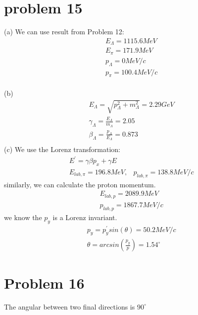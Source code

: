 \documentclass{article}
\begin{document}
\begin{CJK*}{GBK}{song}
\section{problem 15}
(a) We can use result from Problem 12:
\begin{equation} 
\begin{aligned}
&E_{\Lambda}=1115.6MeV\\
&E_{\pi}=171.9MeV\\
&p_{\Lambda}=0MeV/c\\
&p_{\pi}=100.4MeV/c\\
\end{aligned}
\end{equation}


(b)
\begin{equation}
\begin{aligned}
&E_{\Lambda}=\sqrt{p_{\Lambda}^2+m_{\Lambda}^2}=2.29GeV\\
&\gamma_{\Lambda}=\frac{E_{\Lambda}}{m_{\Lambda}}=2.05\\
&\beta_{\Lambda}=\frac{p_{\Lambda}}{E_{\Lambda}}=0.873\\
\end{aligned}
\end{equation}
(c)
We use the Lorenz transformation:
\begin{equation}
\begin{aligned}
&E^{'}=\gamma \beta p_x+\gamma E\\
&E_{lab,\pi}=196.8MeV,
&p_{lab,\pi}=138.8MeV/c
\end{aligned}
\end{equation}
similarly, we can calculate the proton momentum.
\begin{equation}
\begin{aligned}
&E_{lab,p}=2089.9MeV\\
&p_{lab,p}=1867.7MeV/c
\end{aligned}
\end{equation}
we know the $p_y $ is a Lorenz invariant.
\begin{equation}
\begin{aligned}
&p_y=p_y^{'}sin(\theta)=50.2MeV/c\\
&\theta=arcsin(\frac{p_y}{p})=1.54^{\circ}
\end{aligned}
\end{equation}

\section{Problem 16}
The angular between two final directions is $90^{\circ}$


\end{CJK*}
\end{document}
